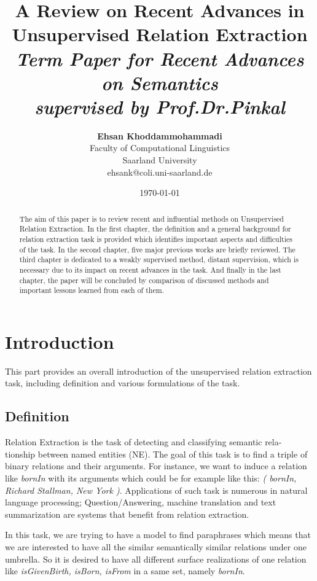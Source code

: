 \documentclass[12pt]{report}
\title{{\bf A Review on Recent Advances in Unsupervised Relation Extraction} \\
\it Term Paper for Recent Advances on Semantics \\ supervised by Prof.Dr.Pinkal}
\author{ {\bf Ehsan Khoddammohammadi}  \\
Faculty of Computational Linguistics \\
Saarland University\\
{\small ehsank@coli.uni-saarland.de}
}
\date{\today}
\begin{document}
\pagestyle{plain}
\maketitle

\pagebreak
\begin{abstract}

The aim of this paper is to review recent and influential methods on
Unsupervised Relation Extraction. In the first chapter, the definition and a general background
for relation extraction task is provided which identifies important aspects and
difficulties of the task. In the second chapter, five major previous works are
briefly reviewed. The third chapter is dedicated to a weakly supervised method, distant supervision, which is 
necessary due to its impact on recent advances in the task. And
finally in the last chapter, the paper will be concluded by comparison of discussed methods and important lessons learned from each of them.


\end{abstract}

\pagebreak
\tableofcontents
\pagebreak

\cleardoublepage
{}

\chapter{Introduction}
\label{ch:intro}

This part provides an overall introduction of the unsupervised relation extraction task, including
definition and various formulations of the task.

\section{Definition}
\label{ch:intro}

Relation Extraction is the task of detecting and classifying semantic rela-
tionship between named entities (NE). The goal of this task is to find a triple
of binary relations and their arguments. For instance, we want to induce a
relation like \emph{bornIn} with its arguments which could be for example like this:\emph{ (
bornIn, Richard Stallman, New York )}. Applications of such task is numerous
in natural language processing; Question/Answering, machine translation and
text summarization are systems that benefit from relation extraction.

In this task, we are trying to have a model to find paraphrases which means
that we are interested to have all the similar semantically similar relations under
one umbrella. So it is desired to have all different surface realizations of one
relation like \emph{isGivenBirth, isBorn, isFrom} in a same set, namely \emph{bornIn}.
\end{document}
